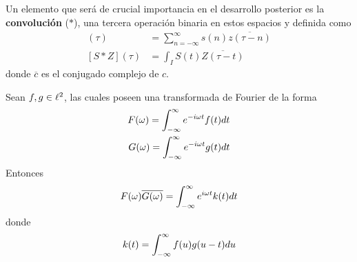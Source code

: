 
Un elemento que será de crucial importancia en el desarrollo posterior es la \textbf{convolución} 
($\ast$), una tercera operación binaria en estos espacios y definida como
%
\begin{align*}
[s \ast z] (\tau) &= \sum_{n=-\infty}^{\infty} s(n) \overline{z(\tau-n)} \\
[S \ast Z] (\tau) &= \int_I S(t) \overline{Z(\tau-t)}
\end{align*}
%
donde $\overline{c}$ es el conjugado complejo de $c$. 
%

\begin{teorema}
Sean $f, g \in \ell^{2}$, las cuales poseen una transformada de Fourier de la forma
\begin{align*}
F(\omega) = \int_{-\infty}^{\infty} e^{-i \omega t} f(t) dt \\
G(\omega) = \int_{-\infty}^{\infty} e^{-i \omega t} g(t) dt 
\end{align*}
Entonces
\begin{equation}
F(\omega) \overline{G(\omega)} = \int_{-\infty}^{\infty} e^{i \omega t} k(t) dt
\end{equation}
donde
\begin{equation}
k(t) = \int_{-\infty}^{\infty} f(u) g(u-t) du
\end{equation}
\end{teorema}


